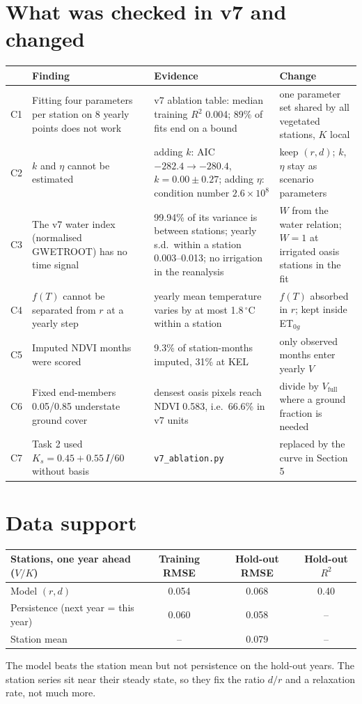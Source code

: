 \documentclass[11pt,a4paper]{article}
\begin{document}
\section{What was checked in v7 and changed}
\begin{table}[H]\small
\begin{tabularx}{\linewidth}{@{}P{0.5cm}P{4.0cm}P{5.6cm}L@{}}
\toprule
 & Finding & Evidence & Change\\
\midrule
C1 & Fitting four parameters per station on 8 yearly points does not work & v7 ablation table: median training $R^2$ 0.004; 89\% of fits end on a bound & one parameter set shared by all vegetated stations, $K$ local\\
C2 & $k$ and $\eta$ cannot be estimated & adding $k$: AIC $-282.4\to-280.4$, $k=0.00\pm0.27$; adding $\eta$: condition number $2.6\times10^{8}$ & keep $(r,d)$; $k$, $\eta$ stay as scenario parameters\\
C3 & The v7 water index (normalised GWETROOT) has no time signal & 99.94\% of its variance is between stations; yearly s.d.\ within a station 0.003--0.013; no irrigation in the reanalysis & $W$ from the water relation; $W=1$ at irrigated oasis stations in the fit\\
C4 & $f(T)$ cannot be separated from $r$ at a yearly step & yearly mean temperature varies by at most 1.8\,$^\circ$C within a station & $f(T)$ absorbed in $r$; kept inside ET$_{0g}$\\
C5 & Imputed NDVI months were scored & 9.3\% of station-months imputed, 31\% at KEL & only observed months enter yearly $V$\\
C6 & Fixed end-members 0.05/0.85 understate ground cover & densest oasis pixels reach NDVI 0.583, i.e.\ 66.6\% in v7 units & divide by $V_{\mathrm{full}}$ where a ground fraction is needed\\
C7 & Task 2 used $K_s=0.45+0.55\,I/60$ without basis & \texttt{v7\_ablation.py} & replaced by the curve in Section 5\\
\bottomrule
\end{tabularx}
\end{table}

\section{Data support}
\begin{table}[H]\small\centering
\begin{tabular}{@{}lccc@{}}
\toprule
Stations, one year ahead ($V/K$) & Training RMSE & Hold-out RMSE & Hold-out $R^2$\\
\midrule
Model $(r,d)$ & 0.054 & 0.068 & 0.40\\
Persistence (next year = this year) & 0.060 & 0.058 & --\\
Station mean & -- & 0.079 & --\\
\bottomrule
\end{tabular}
\end{table}
The model beats the station mean but not persistence on the hold-out years. The station series sit near their steady state, so they fix the ratio $d/r$ and a relaxation rate, not much more.
\end{document}
